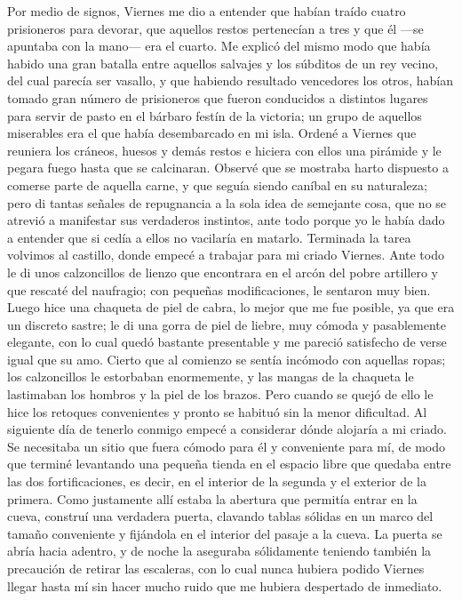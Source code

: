 \documentclass{novela}
\begin{document}
    Por medio de signos, Viernes me dio a entender que habían traído cuatro prisioneros para devorar, que aquellos restos pertenecían a tres y que él —se apuntaba con la mano— era el cuarto. Me explicó del mismo modo que había habido una gran batalla entre aquellos salvajes y los súbditos de un rey vecino, del cual parecía ser vasallo, y que habiendo resultado vencedores los otros, habían tomado gran número de prisioneros que fueron conducidos a distintos lugares para servir de pasto en el bárbaro festín de la victoria; un grupo de aquellos miserables era el que había desembarcado en mi isla.
    Ordené a Viernes que reuniera los cráneos, huesos y demás restos e hiciera con ellos una pirámide y le pegara fuego hasta que se calcinaran. Observé que se mostraba harto dispuesto a comerse parte de aquella carne, y que seguía siendo caníbal en su naturaleza; pero di tantas señales de repugnancia a la sola idea de semejante cosa, que no se atrevió a manifestar sus verdaderos instintos, ante todo porque yo le había dado a entender que si cedía a ellos no vacilaría en matarlo.
    Terminada la tarea volvimos al castillo, donde empecé a trabajar para mi criado Viernes. Ante todo le di unos calzoncillos de lienzo que encontrara en el arcón del pobre artillero y que rescaté del naufragio; con pequeñas modificaciones, le sentaron muy bien. Luego hice una chaqueta de piel de cabra, lo mejor que me fue posible, ya que era un discreto sastre; le di una gorra de piel de liebre, muy cómoda y pasablemente elegante, con lo cual quedó bastante presentable y me pareció satisfecho de verse igual que su amo. Cierto que al comienzo se sentía incómodo con aquellas ropas; los calzoncillos le estorbaban enormemente, y las mangas de la chaqueta le lastimaban los hombros y la piel de los brazos. Pero cuando se quejó de ello le hice los retoques convenientes y pronto se habituó sin la menor dificultad.
    Al siguiente día de tenerlo conmigo empecé a considerar dónde alojaría a mi criado. Se necesitaba un sitio que fuera cómodo para él y conveniente para mí, de modo que terminé levantando una pequeña tienda en el espacio libre que quedaba entre las dos fortificaciones, es decir, en el interior de la segunda y el exterior de la primera. Como justamente allí estaba la abertura que permitía entrar en la cueva, construí una verdadera puerta, clavando tablas sólidas en un marco del tamaño conveniente y fijándola en el interior del pasaje a la cueva. La puerta se abría hacia adentro, y de noche la aseguraba sólidamente teniendo también la precaución de retirar las escaleras, con lo cual nunca hubiera podido Viernes llegar hasta mí sin hacer mucho ruido que me hubiera despertado de inmediato.
\end{document}
